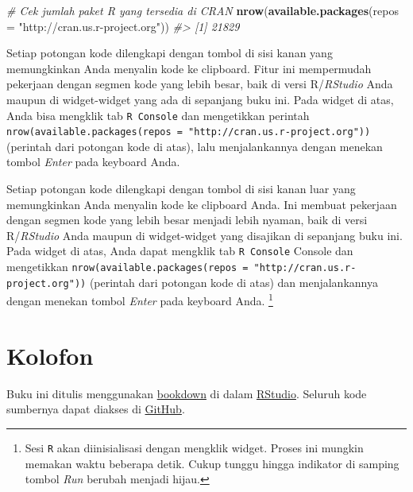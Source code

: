 \documentclass[
  oneside]{book}
\newenvironment{Shaded}{\begin{snugshade}}{\end{snugshade}}
\newcommand{\AttributeTok}[1]{\textcolor[rgb]{0.13,0.29,0.53}{#1}}
\newcommand{\CommentTok}[1]{\textcolor[rgb]{0.56,0.35,0.01}{\textit{#1}}}
\newcommand{\FunctionTok}[1]{\textcolor[rgb]{0.13,0.29,0.53}{\textbf{#1}}}
\newcommand{\NormalTok}[1]{#1}
\newcommand{\StringTok}[1]{\textcolor[rgb]{0.31,0.60,0.02}{#1}}
\begin{document}
\begin{Shaded}
\begin{Highlighting}[]
\CommentTok{\# Cek jumlah paket R yang tersedia di CRAN}
\FunctionTok{nrow}\NormalTok{(}\FunctionTok{available.packages}\NormalTok{(}\AttributeTok{repos =} \StringTok{"http://cran.us.r{-}project.org"}\NormalTok{))}
\CommentTok{\#\textgreater{} [1] 21829}
\end{Highlighting}
\end{Shaded}

Setiap potongan kode dilengkapi dengan tombol di sisi kanan yang
memungkinkan Anda menyalin kode ke clipboard. Fitur ini mempermudah
pekerjaan dengan segmen kode yang lebih besar, baik di versi
R/\emph{RStudio} Anda maupun di widget-widget yang ada di sepanjang
buku ini. Pada widget di atas, Anda bisa mengklik tab
\texttt{R Console} dan mengetikkan perintah
\texttt{nrow(available.packages(repos\ =\ "http://cran.us.r-project.org"))}
(perintah dari potongan kode di atas), lalu menjalankannya dengan
menekan tombol \emph{Enter} pada keyboard Anda.

Setiap potongan kode dilengkapi dengan tombol di sisi kanan luar yang
memungkinkan Anda menyalin kode ke clipboard Anda. Ini membuat pekerjaan
dengan segmen kode yang lebih besar menjadi lebih nyaman, baik di versi
R/\emph{RStudio} Anda maupun di widget-widget yang disajikan di
sepanjang buku ini. Pada widget di atas, Anda dapat mengklik tab
\texttt{R Console} Console dan mengetikkan
\texttt{nrow(available.packages(repos\ =\ "http://cran.us.r-project.org"))}
(perintah dari potongan kode di atas) dan menjalankannya dengan menekan
tombol \emph{Enter} pada keyboard Anda. \footnote{Sesi \texttt{R} akan diinisialisasi dengan mengklik
  widget. Proses ini mungkin memakan waktu beberapa detik. Cukup
  tunggu hingga indikator di samping tombol \emph{Run} berubah menjadi
  hijau.}

\section{Kolofon}\label{kolofon}

Buku ini ditulis menggunakan \href{http://bookdown.org/}{bookdown} di dalam
\href{http://www.rstudio.com/ide/}{RStudio}. Seluruh kode sumbernya dapat
diakses di \href{https://github.com/dedenistiawan/ClustR}{GitHub}.
\end{document}
